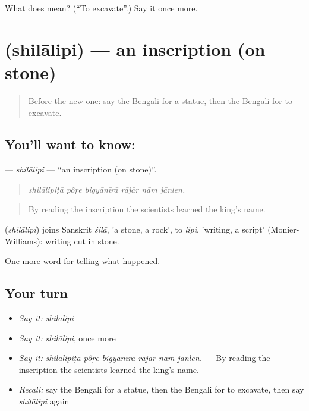 \begin{tcolorbox}[breakable,colback=teal!4,colframe=teal!35!black,title={Before you move on}]
What does   mean? (\textquotedblleft{}To excavate\textquotedblright{}.) Say it once more.
\end{tcolorbox}
\section[\texorpdfstring{\bn{শিলালিপি} (shilālipi)}{শিলালিপি (shilālipi)}]{ (shilālipi) — an inscription (on stone)}

\label{lesson:BN-C319-shilalipi}



\begin{quote}
Before the new one: say the Bengali for a statue, then the Bengali for to excavate.
\end{quote}

\subsection*{You'll want to know: }
\textbf{} — \emph{shilālipi} — \textquotedblleft{}an inscription (on stone)\textquotedblright{}.

\begin{quote}
     
\end{quote}

\begin{quote}
\emph{shilālipiṭā pôṛe bigyānīrā rājār nām jānlen.}
\end{quote}

\begin{quote}
By reading the inscription the scientists learned the king's name.
\end{quote}

\begin{cousinweb}
\textbf{} (\emph{shilālipi}) joins Sanskrit \emph{śilā}, 'a stone, a rock', to \emph{lipi}, 'writing, a script' (Monier-Williams): writing cut in stone.
\end{cousinweb}

\begin{grammarlens}[title={What you've built}]
One more word for telling what happened.
\end{grammarlens}

\subsection*{Your turn}
\begin{itemize}
\raggedright
  \item \emph{Say it:} \emph{shilālipi}
  \item \emph{Say it:} \emph{shilālipi}, once more
  \item \emph{Say it:} \emph{shilālipiṭā pôṛe bigyānīrā rājār nām jānlen.} — By reading the inscription the scientists learned the king's name.
  \item \emph{Recall:} say the Bengali for a statue, then the Bengali for to excavate, then say \emph{shilālipi} again
\end{itemize}

